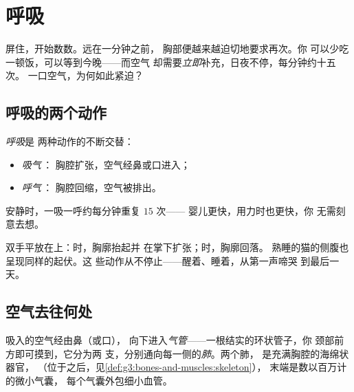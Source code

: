 \chapter{呼吸}\label{ch:g4:breathing}

屏住，开始数数。远在一分钟之前，
胸部便越来越迫切地要求再次。你
可以少吃一顿饭，可以等到今晚——而空气
却需要\emph{立即}补充，日夜不停，每分钟约十五次。
一口空气，为何如此紧迫？

\section{呼吸的两个动作}

\begin{definition}[吸气与呼气]\label{def:g4:breathing:movements}
\emph{呼吸}是
两种动作的不断交替：
\begin{itemize}
  \item \emph{吸气}\,：
        胸腔扩张，空气经鼻或口进入；
  \item \emph{呼气}\,：
        胸腔回缩，空气被排出。
\end{itemize}
安静时，一吸一呼约每分钟重复 $15$ 次——
婴儿更快，用力时也更快，你
无需刻意去想。
\end{definition}

\begin{example}[观察呼吸动作]\label{ex:g4:breathing:watch}
双手平放在上：时，胸廓抬起并
在掌下扩张；时，胸廓回落。
熟睡的猫的侧腹也呈现同样的起伏。这
些动作从不停止——醒着、睡着，从第一声啼哭
到最后一天。
\end{example}

\section{空气去往何处}

\begin{definition}[呼吸器官]\label{def:g4:breathing:organs}
吸入的空气经由鼻（或口），
向下进入\emph{气管}——一根结实的环状管子，你
颈部前方即可摸到，它分为两
支，分别通向每一侧的\emph{肺}。两个肺，
是充满胸腔的海绵状器官，
（位于之后，见\cref{def:g3:bones-and-muscles:skeleton}），
末端是数以百万计的微小气囊，
每个气囊外包细小血管。
\end{definition}

